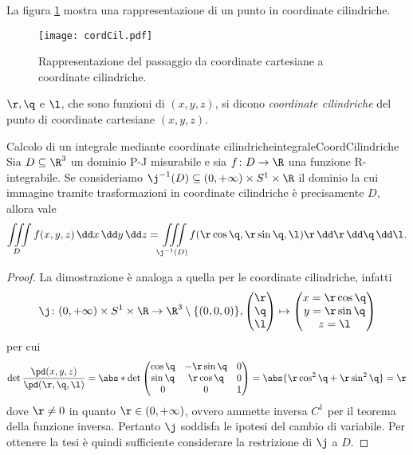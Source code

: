 \begin{oss}
	La figura \ref{fig:cordCil} mostra una rappresentazione di un punto in coordinate cilindriche.
\end{oss}

\begin{figure}[tp]
	\begin{centering}
		\texttt{[image: cordCil.pdf]}
		\caption{Rappresentazione del passaggio da coordinate cartesiane a coordinate cilindriche.}
		\label{fig:cordCil}
	\end{centering}
\end{figure}

\begin{notz}
	\(\r,\q\) e \(\l\), che sono funzioni di \((x,y,z)\), si dicono \emph{coordinate cilindriche} del punto di coordinate cartesiane \((x,y,z)\).
\end{notz}

\begin{prop}{Calcolo di un integrale mediante coordinate cilindriche}{integraleCoordCilindriche}
	Sia \(D\subseteq\R^3\) un dominio P-J misurabile e sia \(f\colon D\to\R\) una funzione R-integrabile.
	Se consideriamo \(\j^{-1}(D)\subseteq (0,+\infty)\times S^1\times \R\) il dominio la cui immagine tramite trasformazioni in coordinate cilindriche è precisamente \(D\), allora vale
	\[
		\iiint\limits_D f(x,y,z)\,\dd x\,\dd y\,\dd z = \iiint\limits_{\j^{-1}(D)} f(\r\cos \q,\r\sin \q,\l)\r\,\dd \r\,\dd \q\,\dd \l.
	\]
\end{prop}

\begin{proof}
	La dimostrazione è analoga a quella per le coordinate cilindriche, infatti
	\[
		\j\colon (0,+\infty)\times S^1\times \R \to \R^3\setminus \{(0,0,0)\},	\begin{pmatrix}
			\r \\
			\q \\
			\l
		\end{pmatrix}
		\mapsto	\begin{pmatrix}
			x = \r\cos \q \\
			y = \r\sin \q \\
			z = \l
		\end{pmatrix}
	\]
	per cui
	\[
		\det \frac{\pd(x,y,z)}{\pd(\r,\q,\l)} = \abs*{\det 	\begin{pmatrix}
				\cos \q & -\r\sin \q & 0 \\
				\sin \q & \r\cos \q  & 0 \\
				0       & 0          & 1
			\end{pmatrix}}
		= \abs{\r\cos^2\q + \r\sin^2\q} = \r
	\]
	dove \(\r\neq 0\) in quanto \(\r\in(0,+\infty)\), ovvero ammette inversa \(C^1\) per il teorema della funzione inversa.
	Pertanto \(\j\) soddisfa le ipotesi del cambio di variabile.
	Per ottenere la tesi è quindi sufficiente considerare la restrizione di \(\j\) a \(D\).
\end{proof}

